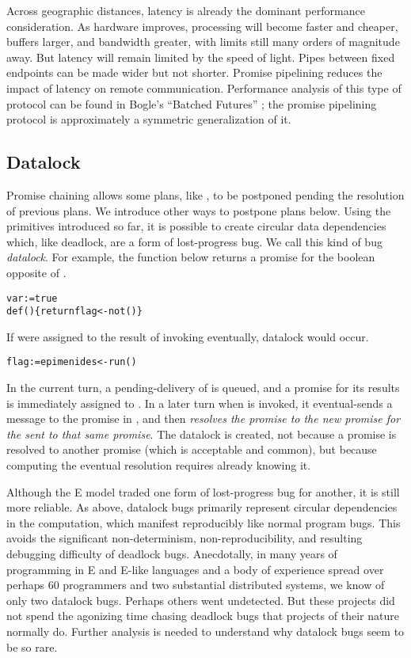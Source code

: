 \documentclass{llncs}
\begin{document}
Across geographic distances, latency is already the dominant
performance consideration. As hardware improves, processing will
become faster and cheaper, buffers larger, and bandwidth greater, with
limits still many orders of magnitude away. But latency will remain
limited by the speed of light. Pipes between fixed endpoints can be
made wider but not shorter. Promise pipelining reduces the impact of
latency on remote communication. Performance analysis of this type of
protocol can be found in Bogle's ``Batched Futures''
\cite{bogle:batched}; the promise pipelining protocol is approximately
a symmetric generalization of it.

\subsection{Datalock}

Promise chaining allows some plans, like , to be postponed
pending the resolution of previous plans. We introduce other ways to
postpone plans below.  Using the primitives introduced so far, it is
possible to create circular data dependencies which, like deadlock,
are a form of lost-progress bug. We call this kind of bug
\emph{datalock}.  For example, the  function below
returns a promise for the boolean opposite of .
%
\begin{alltt}
    var  := true
    def () \{ return flag <- not() \}
\end{alltt}
%
If  were assigned to the result of invoking
 eventually, datalock would occur.
%
\begin{alltt}
    flag := epimenides <- run()
\end{alltt}
%
In the current turn, a pending-delivery of 
is queued, and a promise for its results is immediately assigned to
.  In a later turn when  is invoked, it
eventual-sends a message to the promise in , and then
\emph{resolves the  promise to the new promise for the
 sent to that same  promise}.  The datalock is
created, not because a promise is resolved to another promise (which
is acceptable and common), but because computing the eventual
resolution requires already knowing it.

Although the E model traded one form of lost-progress bug for another,
it is still more reliable. As above, datalock bugs primarily represent
circular dependencies in the computation, which manifest reproducibly
like normal program bugs. This avoids the significant non-determinism,
non-reproducibility, and resulting debugging difficulty of deadlock
bugs. Anecdotally, in many years of programming in E and E-like
languages and a body of experience spread over perhaps 60 programmers
and two substantial distributed systems, we know of only two datalock
bugs. Perhaps others went undetected. But these projects did not spend
the agonizing time chasing deadlock bugs that projects of their nature
normally do.  Further analysis is needed to understand why datalock
bugs seem to be so rare.
\end{document}

